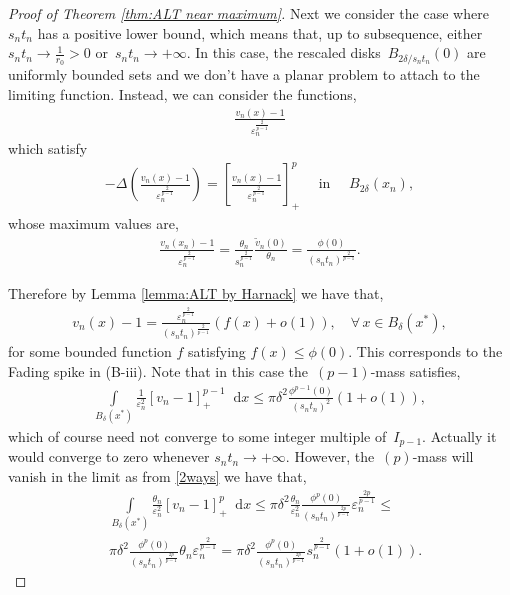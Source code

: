 \documentclass[10pt]{amsart}
\newcommand{\parenthesis}[1]{\left(#1\right)} %
\newcommand{\dd}{\mathop{}\!\mathrm{d}}
\newcommand{\eps}{\varepsilon}
\renewcommand{\to}{\rightarrow}
\newcommand{\dt}{\delta}
\begin{document}
\begin{proof}[Proof of Theorem \ref{thm:ALT near maximum}]
        Next we consider the case where $s_n t_n$ has a positive lower bound, which means that,
        up to subsequence, either~$s_n t_n \to \frac{1}{r_0}>0$ or~$s_n t_n \to +\infty$.
        In this case, the rescaled disks~$B_{2\delta/s_n t_n}(0)$ are uniformly bounded sets and we don't have a planar problem to attach to the limiting
        function. Instead, we can consider the functions,
        \begin{align*}
                \frac{v_n(x)-1}{\eps_n^{\frac{2}{p-1}}}
            \end{align*}
            which satisfy
            \begin{align*}
                -\Delta \parenthesis{\frac{v_n(x)-1}{\eps_n^{\frac{2}{p-1}}}}
                =\left[\frac{v_n(x)-1}{\eps_n^{\frac{2}{p-1}}}\right]_+^p \quad \mbox{ in }\quad B_{2\delta}(x_n),
            \end{align*}
            whose maximum values are,
            \begin{align*}
                \frac{v_n(x_n)-1}{\eps_n^{\frac{2}{p-1}}}
                =\frac{\theta_n}{s_n^{\frac{2}{p-1}}} \frac{\tilde{v}_n(0)}{\theta_n}
                =\frac{\phi(0)}{(s_n t_n)^{\frac{2}{p-1}} }.
            \end{align*}

            Therefore by Lemma \ref{lemma:ALT by Harnack} we have that,
            \begin{align*}
             v_n(x)-1= \frac{\eps_n^{\frac{2}{p-1}} }{(s_n t_n)^{\frac{2}{p-1}}}(f(x)+o(1)),\quad \forall\, x \in B_{\delta}(x^*),
            \end{align*}
            for some bounded function $f$ satisfying $f(x)\leq \phi(0)$.
        This corresponds to the Fading spike in (B-iii). Note that in this case the~$(p-1)$-mass satisfies,
        \begin{align*}
            \int\limits_{B_{\delta}(x^*)} \frac{1}{\eps_n^2} [v_n-1]_+^{p-1} \dd{x}
            \leq \pi \dt^2\frac{\phi^{p-1}(0) }{(s_n t_n)^2}(1+o(1)),
        \end{align*}
        which of course need not converge to some integer multiple of~$I_{p-1}$. Actually it would converge to zero whenever $s_n t_n\to+\infty$.
        However, the~$(p)$-mass will vanish in the limit as from \eqref{2ways} we have that,
          \begin{align*}
            &\int\limits_{B_{\delta}(x^*)} \frac{\theta_n}{\eps_n^2} [v_n-1]_+^{p} \dd{x}
            \leq \pi \dt^2\frac{\theta_n}{\eps_n^2}\frac{\phi^{p}(0)}{(s_n t_n)^{\frac{2p}{p-1}}}{\eps_n^{\frac{2p}{p-1}}}\leq\\
            &\pi \dt^2\frac{\phi^{p}(0)}{(s_n t_n)^{\frac{2p}{p-1}}}\theta_n\eps_n^{\frac{2}{p-1}}=
            \pi \dt^2 \frac{\phi^{p}(0)}{(s_n t_n)^{\frac{2p}{p-1}}} s_n^{\frac{2}{p-1}}(1+o(1)).
        \end{align*}
    \end{proof}
\end{document}
